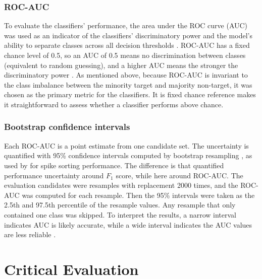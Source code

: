 \documentclass[ %
                    author={Rzan Alkabier},
                    supervisor={Dr. Zahraa Abdallah},
                    degree={MSc},
                     title={Denoising Extracellular Recording for Spike Detection and Classification on Single Channels},
                    subtitle={Does denoising improve detection and classification performance?},
                      type={},
                      year={2026}]{dissertation}
\begin{document}
 \subsection{ROC-AUC}
 To evaluate the classifiers' performance, the area under the ROC curve (AUC) was used as an indicator of the classifiers' discriminatory power and the model's ability to separate classes across all decision thresholds \cite{hanley_meaning_1982}. ROC-AUC has a fixed chance level of 0.5, so an AUC of 0.5 means no discrimination between classes (equivalent to random guessing), and a higher AUC means the stronger the discriminatory power \cite{hosmer_applied_2013}. As mentioned above, because ROC-AUC is invariant to the class imbalance between the minority target and majority non-target, it was chosen as the primary metric for the classifiers. It is fixed chance reference makes it straightforward to assess whether a classifier performs above chance. 
 \subsection{Bootstrap confidence intervals}
 Each ROC-AUC is a point estimate from one candidate set. The uncertainty is quantified with 95\% confidence intervals computed by bootstrap resampling \cite{efron_resampling_2001}, as used by \cite{troglio_hybrid_2026} for spike sorting performance. The difference is that \cite{troglio_hybrid_2026} quantified performance uncertainty around $F_1$ score, while here around ROC-AUC. The evaluation candidates were resamples with replacement 2000 times, and the ROC-AUC was computed for each resample. Then the 95\% intervals were taken as the 2.5th and 97.5th percentile of the resample values. Any resample that only contained one class was skipped. To interpret the results, a narrow interval indicates AUC is likely accurate, while a wide interval indicates the AUC values are less reliable \cite{corbacioglu_receiver_2023}. 
\chapter{Critical Evaluation}
\label{chap:evaluation}
\end{document}
